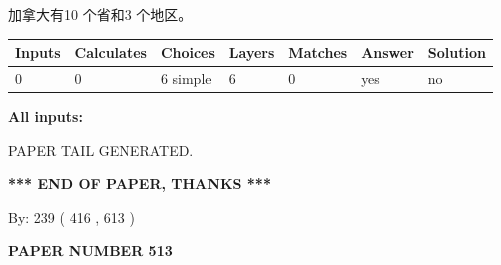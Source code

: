 \documentclass{ctexart}
\begin{document}
 
加拿大有10 个省和3 个地区。
 
 
\noindent{}
 
 
   
   
   
   
\noindent\begin{tabular}{|l|l|l|l|l|l|l|}
 \hline
Inputs & Calculates & Choices & Layers & Matches & Answer & Solution \\ \hline
 0  & 
 0  & 
 6
  simple  
  & 
 6  & 
 0  & 
  yes & 
  no 
  \\ \hline
 \end{tabular}
   
   
   
   
\noindent{}
   
   
   
   
\noindent\vspace{0.1in}\hspace{-0.08in} {\textbf{\Large{All inputs: }}}
   
   
   
   
   
   
 \vspace{0.2in}
 
   
   
\vspace{2.0in} PAPER TAIL GENERATED.
   
   
   
   
\vspace{1.0in} 
{\textbf{\large{ *** END OF PAPER, THANKS *** }}} 
   
   
\hspace{1.0in} By: 
 239 ( 416 ,  613 )
   
   
   
   
\newpage 
\setcounter{page}{ 
   513001 } 
   
   
   
   
 {\textbf{ \Large{ PAPER NUMBER  513  }}}
   
   
\vspace{0.2in}
   
   
   
   
   
   
   
\end{document}
